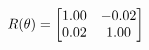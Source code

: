 \documentclass[preview]{standalone}
\begin{document}
\begin{align*}
\special{dvisvgm:raw <g id='unique000'>}R(\theta) = \begin{bmatrix}1.00 & -0.02\\0.02 & 1.00\end{bmatrix}\special{dvisvgm:raw </g>}
\end{align*}
\end{document}

